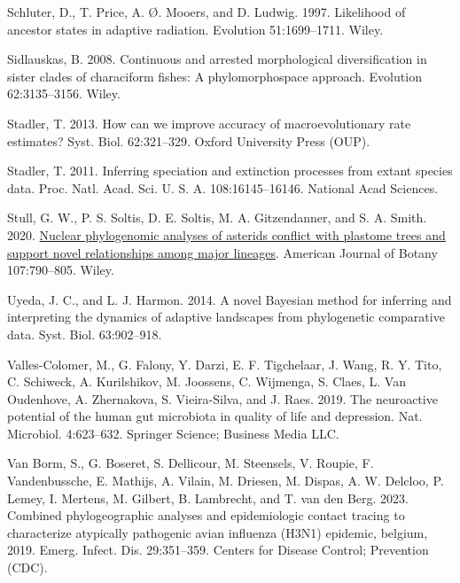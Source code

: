 \documentclass[fleqn,10pt,lineno]{wlpeerj} %
\newlength{\cslhangindent}
\newlength{\cslentryspacingunit} %
\newenvironment{CSLReferences}[2] %
 {%
  \setlength{\parindent}{0pt}
  \ifodd #1
  \let\oldpar\par
  \def\par{\hangindent=\cslhangindent\oldpar}
  \fi
  \setlength{\parskip}{#2\cslentryspacingunit}
 }%
 {}
\begin{document}
\begin{CSLReferences}{1}{0}
\leavevmode{}%
Schluter, D., T. Price, A. Ø. Mooers, and D. Ludwig. 1997. Likelihood of ancestor states in adaptive radiation. Evolution 51:1699--1711. Wiley.

\leavevmode{}%
Sidlauskas, B. 2008. Continuous and arrested morphological diversification in sister clades of characiform fishes: A phylomorphospace approach. Evolution 62:3135--3156. Wiley.

\leavevmode{}%
Stadler, T. 2013. How can we improve accuracy of macroevolutionary rate estimates? Syst. Biol. 62:321--329. Oxford University Press (OUP).

\leavevmode{}%
Stadler, T. 2011. Inferring speciation and extinction processes from extant species data. Proc. Natl. Acad. Sci. U. S. A. 108:16145--16146. National Acad Sciences.

\leavevmode{}%
Stull, G. W., P. S. Soltis, D. E. Soltis, M. A. Gitzendanner, and S. A. Smith. 2020. \href{https://doi.org/10.1002/ajb2.1468}{Nuclear phylogenomic analyses of asterids conflict with plastome trees and support novel relationships among major lineages}. American Journal of Botany 107:790--805. Wiley.

\leavevmode{}%
Uyeda, J. C., and L. J. Harmon. 2014. A novel {B}ayesian method for inferring and interpreting the dynamics of adaptive landscapes from phylogenetic comparative data. Syst. Biol. 63:902--918.

\leavevmode{}%
Valles-Colomer, M., G. Falony, Y. Darzi, E. F. Tigchelaar, J. Wang, R. Y. Tito, C. Schiweck, A. Kurilshikov, M. Joossens, C. Wijmenga, S. Claes, L. Van Oudenhove, A. Zhernakova, S. Vieira-Silva, and J. Raes. 2019. The neuroactive potential of the human gut microbiota in quality of life and depression. Nat. Microbiol. 4:623--632. Springer Science; Business Media LLC.

\leavevmode{}%
Van Borm, S., G. Boseret, S. Dellicour, M. Steensels, V. Roupie, F. Vandenbussche, E. Mathijs, A. Vilain, M. Driesen, M. Dispas, A. W. Delcloo, P. Lemey, I. Mertens, M. Gilbert, B. Lambrecht, and T. van den Berg. 2023. Combined phylogeographic analyses and epidemiologic contact tracing to characterize atypically pathogenic avian influenza ({H3N1}) epidemic, belgium, 2019. Emerg. Infect. Dis. 29:351--359. Centers for Disease Control; Prevention (CDC).


\end{CSLReferences}
\end{document}
